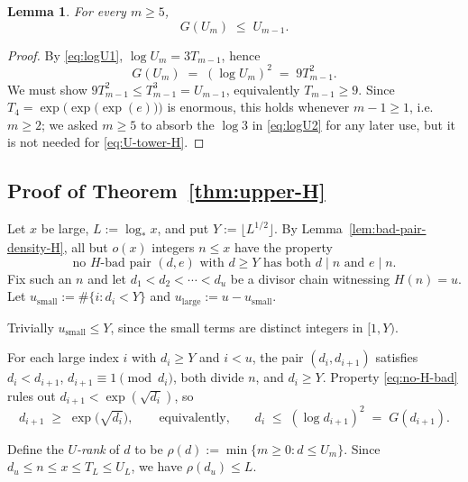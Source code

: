 \documentclass[11pt,reqno]{amsart}
\theoremstyle{plain}
\newtheorem{lemma}[theorem]{Lemma}
\theoremstyle{definition}
\newcommand{\logstar}{\log_{\!*}}
\begin{document}
\begin{lemma}\label{lem:U-tower-H}
For every $m\ge 5$,
\begin{equation}\label{eq:U-tower-H}
G(U_m) \;\le\; U_{m-1}.
\end{equation}
\end{lemma}

\begin{proof}
By \eqref{eq:logU1}, $\log U_m = 3T_{m-1}$, hence
\[
G(U_m) \;=\; (\log U_m)^2 \;=\; 9 T_{m-1}^2.
\]
We must show $9T_{m-1}^2\le T_{m-1}^3=U_{m-1}$, equivalently $T_{m-1}\ge 9$. Since
$T_4=\exp\bigl(\exp\bigl(\exp(e)\bigr)\bigr)$ is enormous, this holds whenever
$m-1\ge 1$, i.e.\ $m\ge 2$; we asked $m\ge 5$ to absorb the $\log 3$ in
\eqref{eq:logU2} for any later use, but it is not needed for
\eqref{eq:U-tower-H}.
\end{proof}

\subsection{Proof of Theorem~\ref{thm:upper-H}}

Let $x$ be large, $L:=\logstar x$, and put $Y:=\lfloor L^{1/2}\rfloor$.
By Lemma~\ref{lem:bad-pair-density-H}, all but $o(x)$ integers $n\le x$ have the
property
\begin{equation}\label{eq:no-H-bad}
\text{no $H$-bad pair $(d,e)$ with $d\ge Y$ has both $d\mid n$ and $e\mid n$}.
\tag{$\star_H$}
\end{equation}
Fix such an $n$ and let $d_1<d_2<\cdots<d_u$ be a divisor chain witnessing
$H(n)=u$. Let
$u_{\mathrm{small}}:=\#\{i:d_i<Y\}$ and $u_{\mathrm{large}}:=u-u_{\mathrm{small}}$.

Trivially $u_{\mathrm{small}}\le Y$, since the small terms are distinct integers in $[1,Y)$.

For each large index $i$ with $d_i\ge Y$ and $i<u$, the pair
$(d_i,d_{i+1})$ satisfies $d_i<d_{i+1}$, $d_{i+1}\equiv 1\pmod{d_i}$, both
divide $n$, and $d_i\ge Y$. Property \eqref{eq:no-H-bad} rules out
$d_{i+1}<\exp(\sqrt{d_i})$, so
\begin{equation}\label{eq:large-step-H}
d_{i+1} \;\ge\; \exp\bigl(\sqrt{d_i}\bigr),
\qquad\text{equivalently,}\qquad
d_i \;\le\; (\log d_{i+1})^2 \;=\; G(d_{i+1}).
\end{equation}

Define the \emph{$U$-rank} of $d$ to be
$\rho(d):=\min\{m\ge 0 : d\le U_m\}$. Since $d_u\le n\le x\le T_L\le U_L$, we
have $\rho(d_u)\le L$.
\end{document}
